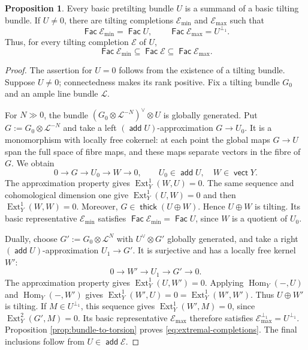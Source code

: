 \documentclass[a4paper,reqno]{amsart}
\def\E{\mathcal{E}}
\def\L{\mathcal{L}}
\DeclareMathOperator{\add}{\mathsf{add}}
\DeclareMathOperator{\Fac}{\mathsf{Fac}}
\DeclareMathOperator{\vect}{\mathsf{vect}}
\DeclareMathOperator{\thick}{\mathsf{thick}}
\DeclareMathOperator{\Hom}{Hom}
\DeclareMathOperator{\Ext}{Ext}
\theoremstyle{definition}
\newtheorem{Prop}[Thm]{Proposition}
\begin{document}
\begin{Prop}\label{Bongcomp}
Every basic pretilting bundle $U$ is a summand of a basic tilting bundle. If $U\ne0$, there are tilting completions $\E_{\min}$ and $\E_{\max}$ such that
\begin{equation}\label{eq:extremal-completions}
\Fac\E_{\min}=\Fac U,
\qquad
\Fac\E_{\max}=U^{\perp_1}.
\end{equation}
Thus, for every tilting completion $\E$ of $U$,
\[
\Fac\E_{\min}\subseteq\Fac\E\subseteq\Fac\E_{\max}.
\]
\end{Prop}
\begin{proof}
The assertion for $U=0$ follows from the existence of a tilting bundle. Suppose $U\ne0$; connectedness makes its rank positive. Fix a tilting bundle $G_0$ and an ample line bundle $\L$.

For $N\gg0$, the bundle $(G_0\otimes\L^{-N})^\vee\otimes U$ is globally generated. Put $G:=G_0\otimes\L^{-N}$ and take a left $(\add U)$-approximation $G\to U_0$. It is a monomorphism with locally free cokernel: at each point the global maps $G\to U$ span the full space of fibre maps, and these maps separate vectors in the fibre of $G$. We obtain
\[
0\longrightarrow G\longrightarrow U_0\longrightarrow W\longrightarrow0,
\qquad U_0\in\add U,\quad W\in\vect Y.
\]
The approximation property gives $\Ext_Y^1(W,U)=0$. The same sequence and cohomological dimension one give $\Ext_Y^1(U,W)=0$ and then $\Ext_Y^1(W,W)=0$. Moreover, $G\in\thick(U\oplus W)$. Hence $U\oplus W$ is tilting. Its basic representative $\E_{\min}$ satisfies $\Fac\E_{\min}=\Fac U$, since $W$ is a quotient of $U_0$.

Dually, choose $G':=G_0\otimes\L^N$ with $U^\vee\otimes G'$ globally generated, and take a right $(\add U)$-approximation $U_1\to G'$. It is surjective and has a locally free kernel $W'$:
\[
0\longrightarrow W'\longrightarrow U_1\longrightarrow G'\longrightarrow0.
\]
The approximation property gives $\Ext_Y^1(U,W')=0$. Applying $\Hom_Y(-,U)$ and $\Hom_Y(-,W')$ gives $\Ext_Y^1(W',U)=0=\Ext_Y^1(W',W')$. Thus $U\oplus W'$ is tilting. If $M\in U^{\perp_1}$, this sequence gives $\Ext_Y^1(W',M)=0$, since $\Ext_Y^2(G',M)=0$. Its basic representative $\E_{\max}$ therefore satisfies $\E_{\max}^{\perp_1}=U^{\perp_1}$. Proposition \ref{prop:bundle-to-torsion} proves \eqref{eq:extremal-completions}. The final inclusions follow from $U\in\add\E$.
\end{proof}
\end{document}
